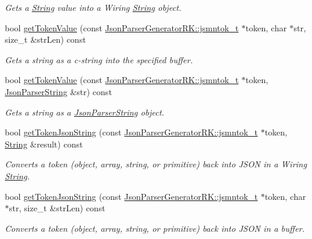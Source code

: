 \begin{DoxyCompactItemize}
\begin{DoxyCompactList}\small\item\em Gets a \hyperlink{class_string}{String} value into a Wiring \hyperlink{class_string}{String} object. \end{DoxyCompactList}\item 
bool \hyperlink{class_json_parser_aa5c0b33d4ddeae1e0d605e166a2a772c}{get\+Token\+Value} (const \hyperlink{struct_json_parser_generator_r_k_1_1jsmntok__t}{Json\+Parser\+Generator\+R\+K\+::jsmntok\+\_\+t} $\ast$token, char $\ast$str, size\+\_\+t \&str\+Len) const
\begin{DoxyCompactList}\small\item\em Gets a string as a c-\/string into the specified buffer. \end{DoxyCompactList}\item 
bool \hyperlink{class_json_parser_a6942f718b6b73d2ff1611f55aec8569c}{get\+Token\+Value} (const \hyperlink{struct_json_parser_generator_r_k_1_1jsmntok__t}{Json\+Parser\+Generator\+R\+K\+::jsmntok\+\_\+t} $\ast$token, \hyperlink{class_json_parser_string}{Json\+Parser\+String} \&str) const
\begin{DoxyCompactList}\small\item\em Gets a string as a \hyperlink{class_json_parser_string}{Json\+Parser\+String} object. \end{DoxyCompactList}\item 
bool \hyperlink{class_json_parser_a334ccfff663a5d3155a799049896d55c}{get\+Token\+Json\+String} (const \hyperlink{struct_json_parser_generator_r_k_1_1jsmntok__t}{Json\+Parser\+Generator\+R\+K\+::jsmntok\+\_\+t} $\ast$token, \hyperlink{class_string}{String} \&result) const
\begin{DoxyCompactList}\small\item\em Converts a token (object, array, string, or primitive) back into J\+S\+ON in a Wiring \hyperlink{class_string}{String}. \end{DoxyCompactList}\item 
bool \hyperlink{class_json_parser_af235693afede52de81794e3773e5cff4}{get\+Token\+Json\+String} (const \hyperlink{struct_json_parser_generator_r_k_1_1jsmntok__t}{Json\+Parser\+Generator\+R\+K\+::jsmntok\+\_\+t} $\ast$token, char $\ast$str, size\+\_\+t \&str\+Len) const
\begin{DoxyCompactList}\small\item\em Converts a token (object, array, string, or primitive) back into J\+S\+ON in a buffer. \end{DoxyCompactList}\item 

\end{DoxyCompactItemize}
